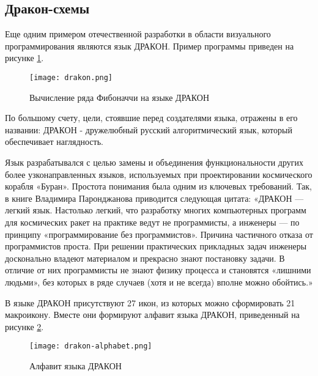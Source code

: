 \subsection{Дракон-схемы}

Еще одним примером отечественной разработки в области визуального программирования являются язык ДРАКОН. Пример программы приведен на рисунке \ref{fig:drakon}.

\begin{figure}[htbp]
	\centering
	\texttt{[image: drakon.png]}
	\caption{Вычисление ряда Фибоначчи на языке ДРАКОН}%
	\label{fig:drakon}
\end{figure}

По большому счету, цели, стоявшие перед создателями языка, отражены в его названии: ДРАКОН - дружелюбный русский алгоритмический язык, который обеспечивает наглядность.

Язык разрабатывался с целью замены и объединения функциональности других более узконаправленных языков, используемых при проектировании космического корабля «Буран». Простота понимания была одним из ключевых требований. Так, в книге Владимира Паронджанова приводится следующая цитата: «ДРАКОН — легкий язык. Настолько легкий, что разработку многих компьютерных программ для космических ракет на практике ведут не программисты, а инженеры — по принципу «программирование без программистов». Причина частичного отказа от программистов проста. При решении практических прикладных задач инженеры досконально владеют материалом и прекрасно знают постановку задачи. В отличие от них программисты не знают физику процесса и становятся «лишними людьми», без которых в ряде случаев (хотя и не всегда) вполне можно обойтись.» \cite{drakon}

В языке ДРАКОН присутствуют 27 икон, из которых можно сформировать 21 макроикону. Вместе они формируют алфавит языка ДРАКОН, приведенный на рисунке \ref{fig:drakon-alphabet}.

\begin{figure}[htbp]
	\centering
	\texttt{[image: drakon-alphabet.png]}
	\caption{Алфавит языка ДРАКОН}%
	\label{fig:drakon-alphabet}
\end{figure}

